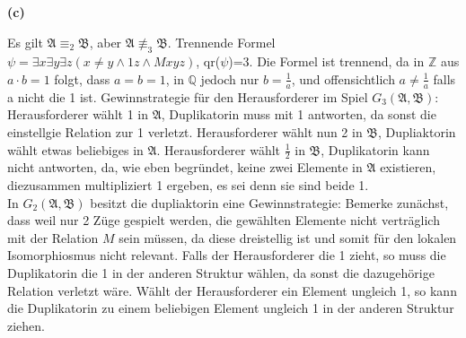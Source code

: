 \documentclass[11pt, a4paper]{article}
\newcommand{\struc}[1]{\ensuremath{\mathfrak{#1}}}
\begin{document}
\textbf{(c)}
\begin{adjustwidth}{20pt}{20pt}
	Es gilt $\struc{A} \equiv_2 \struc{B}$, aber $\struc{A} \not\equiv_3 \struc{B}$. Trennende Formel $\psi=\exists x \exists y \exists z(x \neq y \wedge 1z \wedge Mxyz)$, qr($\psi$)=3.
	Die Formel ist trennend, da in $\mathbb{Z}$ aus $a\cdot b=1$ folgt, dass $a=b=1$, in $\mathbb{Q}$ jedoch nur $b = \frac{1}{a}$, und offensichtlich $a \neq \frac{1}{a}$ falls a nicht die 1
	ist.
Gewinnstrategie für den Herausforderer im Spiel $G_3(\struc{A},\struc{B})$: Herausforderer wählt 1 in \struc{A}, Duplikatorin muss mit 1 antworten, da sonst die einstellgie Relation
zur 1 verletzt. Herausforderer wählt nun 2 in \struc{B}, Dupliaktorin wählt etwas beliebiges in \struc{A}. Herausforderer wählt $\frac{1}{2}$ in \struc{B}, Duplikatorin kann nicht
antworten, da, wie eben begründet, keine zwei Elemente in \struc{A} existieren, diezusammen multipliziert 1 ergeben, es sei denn sie sind beide 1.\\
In $G_2(\struc{A},\struc{B})$ besitzt die dupliaktorin eine Gewinnstrategie: Bemerke zunächst, dass weil nur 2 Züge gespielt werden, die gewählten Elemente nicht verträglich mit der
Relation $M$ sein müssen, da diese dreistellig ist und somit für den lokalen Isomorphiosmus nicht relevant. Falls der Herausforderer die 1 zieht, so muss die Duplikatorin die 1 in der anderen
Struktur wählen, da sonst die dazugehörige Relation verletzt wäre. Wählt der Herausforderer ein Element ungleich 1, so kann die Duplikatorin zu einem beliebigen Element ungleich 1 in der
anderen Struktur ziehen.
\end{adjustwidth}
\end{document}

